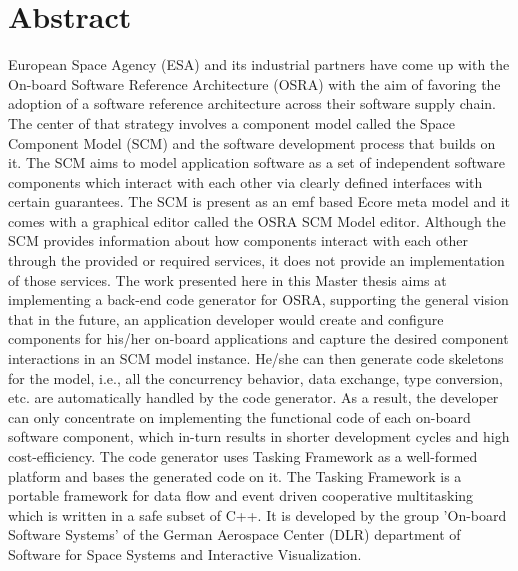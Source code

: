 \documentclass[
               fontsize=12pt, %
               paper=a4,
               twoside, %
               BCOR=3mm, %
               DIV=13,   %
               headinclude=true,
               footinclude=false,
               bibliography=totoc,
               headsepline,
               cleardoublepage=empty,
               parskip=half,
               final   %
               ]{scrbook}
\begin{document}
\section*{Abstract}
European Space Agency (ESA) and its industrial partners have come up with the On-board Software Reference Architecture (OSRA) with the aim of favoring the adoption of a software reference architecture across their software supply chain. The center of that strategy involves a component model called the Space Component Model (SCM) and the software development process that builds on it. The SCM aims to model application software as a set of independent software components which interact with each other via clearly defined interfaces with certain guarantees. The SCM is present as an \ac{emf} based Ecore meta model and it comes with a graphical editor called the OSRA SCM Model editor. Although the SCM provides information about how components interact with each other through the provided or required services, it does not provide an implementation of those services. The work presented here in this Master thesis aims at implementing a back-end code generator for OSRA, supporting the general vision that in the future, an application developer would create and configure components for his/her on-board applications and capture the desired component interactions in an SCM model instance. He/she can then generate code skeletons for the model, i.e., all the concurrency behavior, data exchange, type conversion, etc. are automatically handled by the code generator. As a result, the developer can only concentrate on implementing the functional code of each on-board software component, which in-turn results in shorter development cycles and high cost-efficiency. The code generator uses Tasking Framework as a well-formed platform and bases the generated code on it. The Tasking Framework is a portable framework for data flow and event driven cooperative multitasking which is written in a safe subset of C++. It is developed by the group 'On-board Software Systems' of the German Aerospace Center (DLR) department of Software for Space Systems and Interactive Visualization.      
\cleardoublepage
\end{document}
